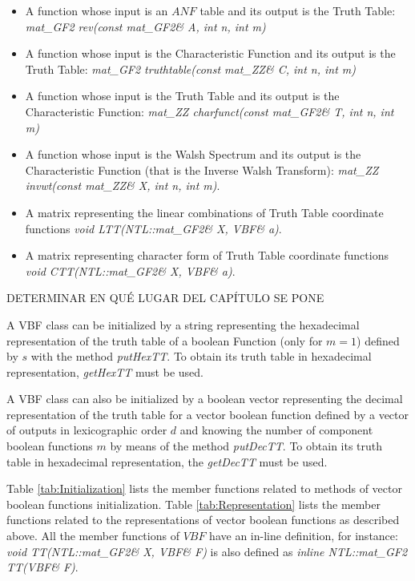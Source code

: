 \begin{itemize}
\item A function whose input is an $ANF$ table and its output is the Truth Table: \textsl{mat\_GF2 rev(const mat\_GF2\& A, int n, int m)}
\item A function whose input is the Characteristic Function and its output is the Truth Table: \textsl{mat\_GF2 truthtable(const mat\_ZZ\& C, int n, int m)}
\item A function whose input is the Truth Table and its output is
the Characteristic Function: \textsl{mat\_ZZ charfunct(const mat\_GF2\& T, int n, int m)}
\item A function whose input is the Walsh Spectrum and its output is
the Characteristic Function (that is the Inverse Walsh Transform): \textsl{mat\_ZZ invwt(const mat\_ZZ\& X, int n, int m)}.
\item A matrix representing the linear combinations of Truth Table coordinate functions \textsl{void LTT(NTL::mat\_GF2\& X, VBF\& a)}.
\item A matrix representing character form of Truth Table coordinate functions \textsl{void CTT(NTL::mat\_GF2\& X, VBF\& a)}.

\end{itemize}

\newpage

DETERMINAR EN QUÉ LUGAR DEL CAPÍTULO SE PONE


A VBF class can be initialized by a string representing the hexadecimal representation of the truth table of a boolean Function (only for $m=1$) defined by $s$ with the method \textsl{putHexTT}. To obtain its truth table in hexadecimal representation, \textsl{getHexTT} must be used.






A VBF class can also be initialized by a boolean vector representing the
decimal representation of the truth table for a vector boolean function defined
by a vector of outputs in lexicographic order $d$ and knowing the number of
component boolean functions $m$ by means of the method \textsl{putDecTT}. To
obtain its truth table in hexadecimal representation, the \textsl{getDecTT}
must be used. 








Table \ref{tab:Initialization} lists the member functions related to
methods of vector boolean functions initialization. Table
\ref{tab:Representation} lists the member functions related to the
representations of vector boolean functions as described above. All the member
functions of $VBF$ have an in-line definition, for instance: \textsl{void 
  TT(NTL::mat\_GF2\& X, VBF\& F)} is also defined as \textsl{inline
  NTL::mat\_GF2 TT(VBF\& F)}. 

